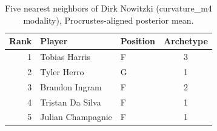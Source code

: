 \begin{table}[htbp]
  \centering\small
  \begin{tabular}{rllc}
    \toprule
    Rank & Player & Position & Archetype \\
    \midrule
    1 & Tobias Harris & F & 3 \\
    2 & Tyler Herro & G & 1 \\
    3 & Brandon Ingram & F & 2 \\
    4 & Tristan Da Silva & F & 1 \\
    5 & Julian Champagnie & F & 1 \\
    \bottomrule
  \end{tabular}
  \caption{Five nearest neighbors of Dirk Nowitzki (curvature_m4 modality), Procrustes-aligned posterior mean.}
  \label{tab:Dirk_Nowitzki_neighbors_curvature_m4}
\end{table}

